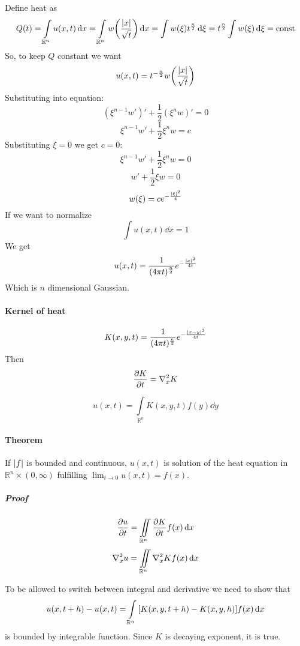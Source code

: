 Define heat as
$$Q(t) = \int\limits_{\mathbb{R}^n} u(x,t) \dd{x} = \int\limits_{\mathbb{R}^n} w\qty(\frac{\abs{x}}{\sqrt{t}}) \dd{x} = \int w(\xi) t^{\frac{n}{2}} \dd{\xi} = t^{\frac{n}{2}} \int w(\xi) \dd{\xi} = \text{const}$$
So, to keep $Q$ constant we want
$$u(x,t) = t^{-\frac{n}{2}} w\qty(\frac{\abs{x}}{\sqrt{t}}) $$
Substituting into equation:
$$(\xi^{n-1}w')' + \frac{1}{2} (\xi^n w)' = 0$$
$$\xi^{n-1}w' + \frac{1}{2} \xi^n w = c$$
Substituting $\xi=0$ we get $c=0$:
$$\xi^{n-1}w' + \frac{1}{2} \xi^n w = 0$$
$$w' + \frac{1}{2} \xi w = 0$$
$$w(\xi) = ce^{-\frac{\abs{\xi}^2}{4}}$$
If we want to normalize
$$\int u(x,t) \dd{x} = 1$$
We get
$$u(x,t) = \frac{1}{(4\pi t)^{\frac{n}{2}}} e^{-\frac{\abs{x}^2}{4t}}$$
Which is $n$ dimensional Gaussian.

\paragraph{Kernel of heat}
$$K(x,y,t) = \frac{1}{(4\pi t)^{\frac{n}{2}}} e^{-\frac{\abs{x-y}^2}{4t}}$$
Then
$$\pdv{K}{t} = \laplacian_x{K}$$

$$u(x,t) = \int\limits_{\mathbb{R}^n} K(x,y,t) f(y) \dd{y}$$
\paragraph{Theorem} 
If $\abs{f}$ is bounded and continuous, $u(x,t)$ is solution of the heat equation in $\mathbb{R}^n \times (0, \infty)$ fulfilling $\lim_{t\to0} u(x,t) = f(x)$.
\subparagraph{Proof}
$$\pdv{u}{t} = \iint\limits_{\mathbb{R}^n} \pdv{K}{t} f(x) \dd{x}$$
$$\laplacian_x{u} = \iint\limits_{\mathbb{R}^n} \laplacian_x{K} f(x) \dd{x}$$

To be allowed to switch between integral and derivative we need to show that
$$u(x,t+h) - u(x,t) = \int\limits_{\mathbb{R}^n} \qty[K(x,y,t+h) -K(x,y,h) ] f(x) \dd{x}$$
is bounded by integrable function. Since $K$ is decaying exponent, it is true.